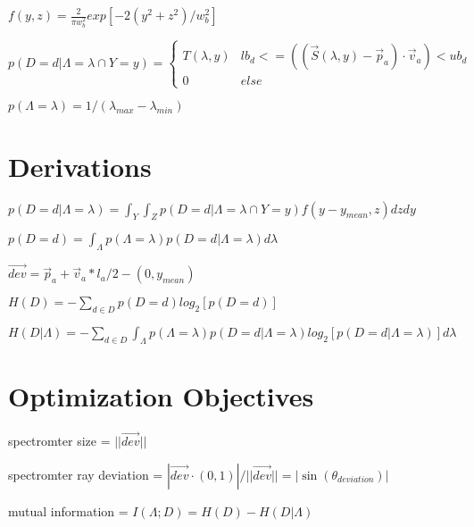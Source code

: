\documentclass{article}
\begin{document}
$f(y, z) = \frac{2}{\pi w_b^2}exp[-2(y^2 + z^2)/w_b^2]$

$$p(D=d|\Lambda=\lambda \cap Y=y) = \begin{cases}
T(\lambda, y) & lb_d <= ((\vec{S}(\lambda, y) - \vec{p}_a) \cdot \vec{v}_a) < ub_d \\
0 & else \end{cases}$$

$p(\Lambda=\lambda) = 1 / (\lambda_{max} - \lambda_{min})$



\section{Derivations}\label{sec:derivations}

$p(D=d|\Lambda=\lambda) = \int_Y\int_Z p(D=d|\Lambda=\lambda \cap Y=y)f(y - y_{mean}, z)dz dy$

$p(D=d) = \int_\Lambda p(\Lambda=\lambda) p(D=d|\Lambda=\lambda)d\lambda$

$\vec{dev} = \vec{p}_a + \vec{v}_a * l_a / 2 - (0, y_{mean})$

$H(D) = -\sum_{d \in D}p(D=d) log_2[p(D=d)]$

$H(D|\Lambda) = -\sum_{d \in D}\int_{\Lambda}p(\Lambda=\lambda) p(D=d|\Lambda=\lambda) log_2[p(D=d|\Lambda=\lambda)] d\lambda$

\section{Optimization Objectives}\label{sec:optimization-objectives}

spectromter size = $||\vec{dev}||$

spectromter ray deviation = $| \vec{dev} \cdot (0, 1) | / ||\vec{dev}|| = | \sin(\theta_{deviation}) | $

mutual information = $I(\Lambda; D) = H(D) - H(D|\Lambda)$
\end{document}
